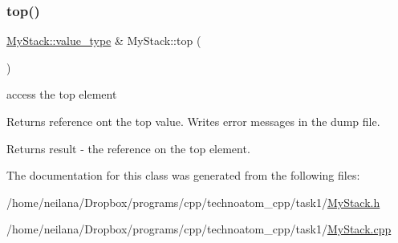 \subsubsection{\texorpdfstring{top()}{top()}}
{\footnotesize\ttfamily \hyperlink{class_my_stack_aef491ce2544b335e96d24a39ad23bc7c}{My\+Stack\+::value\+\_\+type} \& My\+Stack\+::top (\begin{DoxyParamCaption}{ }\end{DoxyParamCaption})}



access the top element 

Returns reference ont the top value. Writes error messages in the dump file.

\begin{DoxyReturn}{Returns}
{\ttfamily result} -\/ the reference on the top element. 
\end{DoxyReturn}


The documentation for this class was generated from the following files\+:\begin{DoxyCompactItemize}
\item 
/home/neilana/\+Dropbox/programs/cpp/technoatom\+\_\+cpp/task1/\hyperlink{_my_stack_8h}{My\+Stack.\+h}\item 
/home/neilana/\+Dropbox/programs/cpp/technoatom\+\_\+cpp/task1/\hyperlink{_my_stack_8cpp}{My\+Stack.\+cpp}\end{DoxyCompactItemize}
